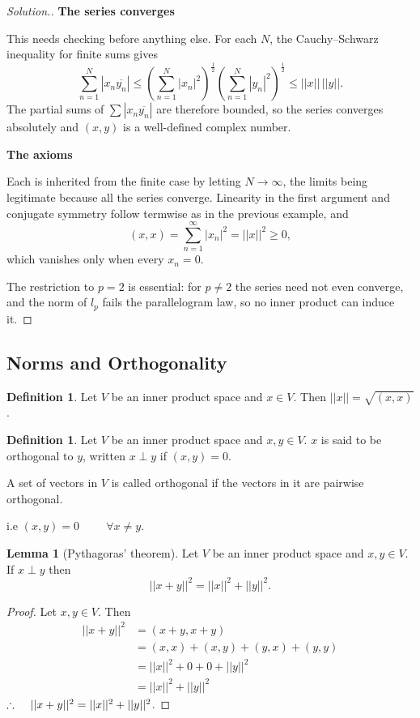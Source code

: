 \documentclass[11pt,a4paper]{article}
\theoremstyle{definition}
\newtheorem{defn}[thm]{Definition}
\newtheorem{lem}[thm]{Lemma}
\newenvironment{solution}
  {\renewcommand{\qedsymbol}{}\begin{proof}[\textit{Solution}.]}
  {\end{proof}}
\newcommand{\subhead}[1]{%
  \par\medskip\noindent\textbf{#1}\par\nobreak\smallskip}
\begin{document}
\begin{solution}
\subhead{The series converges}
This needs checking before anything else. For each $N$, the Cauchy--Schwarz
inequality for finite sums gives
$$\sum_{n=1}^{N}|x_n\overline{y_n}|
\leq\left(\sum_{n=1}^{N}|x_n|^2\right)^{\frac12}
\left(\sum_{n=1}^{N}|y_n|^2\right)^{\frac12}\leq ||x||\,||y|| .$$
The partial sums of $\sum|x_n\overline{y_n}|$ are therefore bounded, so the
series converges absolutely and $(x,y)$ is a well-defined complex number.

\subhead{The axioms}
Each is inherited from the finite case by letting $N\rightarrow\infty$, the
limits being legitimate because all the series converge. Linearity in the first
argument and conjugate symmetry follow termwise as in the previous example, and
$$(x,x)=\sum_{n=1}^{\infty}|x_n|^2=||x||^2\geq 0 ,$$
which vanishes only when every $x_n=0$.

The restriction to $p=2$ is essential: for $p\neq 2$ the series need not even
converge, and the norm of $l_p$ fails the parallelogram law, so no inner product
can induce it.
\end{solution}


\subsection{Norms and Orthogonality}

\begin{defn}
Let $V$ be an inner product space and $x\in V$. Then $||x||=\sqrt{(x,x)}$.

\end{defn}

\begin{defn}
Let $V$ be an inner product space and $x,y\in V$. $x$ is said to be orthogonal to $y$, written $x\perp y$ if $(x,y)=0$.


A set of vectors in $V$ is called orthogonal if the vectors in it are pairwise orthogonal.

   i.e $(x,y)=0\hspace{1cm} \forall x\neq y$.

   
   
\pagebreak  
\end{defn}
\begin{lem}[Pythagoras' theorem]
Let $V$ be an inner product space and $x,y\in V$. If $x\perp y$ then $$||x+y||^2=||x||^2+||y||^2.$$
\end{lem}

\begin{proof}
Let $x,y\in V$. Then
\begin{align*}
||x+y||^2  &=(x+y,x+y)\\
           &=(x,x)+(x,y)+(y,x)+(y,y)\\
           &=||x||^2+0+0+||y||^2\\
           &=||x||^2+||y||^2
\end{align*}    
$\therefore \hspace{0.4cm} ||x+y||^2=||x||^2+||y||^2$.

\end{proof}
\end{document}
